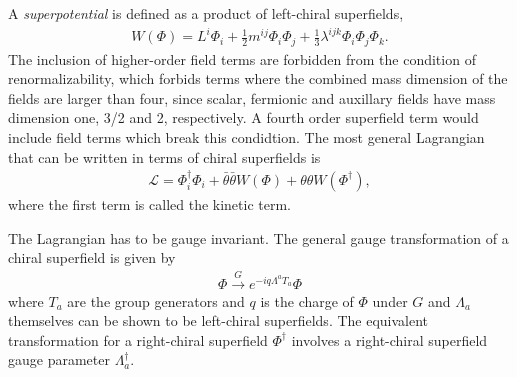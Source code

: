 \documentclass[twoside,english]{uiofysmaster}
\begin{document}
 A {\it superpotential} is defined as a product of left-chiral superfields,
 \begin{align}
 	W(\Phi) = L^i\Phi_i + \frac{1}{2}m^{ij}\Phi_i\Phi_j + \frac{1}{3}\lambda^{ijk}\Phi_i\Phi_j\Phi_k.
 \end{align}
The inclusion of higher-order field terms are forbidden from the condition of renormalizability, which forbids terms where the combined mass dimension of the fields are larger than four, since scalar, fermionic and auxillary fields have mass dimension one, 3/2 and 2, respectively. A fourth order superfield term would include field terms which break this condidtion. The most general Lagrangian that can be written in terms of chiral superfields is
\begin{align}
	\mathcal{L} = \Phi_i^\dag \Phi_i + \bar\theta\bar\theta W(\Phi) + \theta\theta W(\Phi^\dag),
\end{align}
where the first term is called the kinetic term. 

The Lagrangian has to be gauge invariant. The general gauge transformation of a chiral superfield is given by
\begin{align}
	\Phi \overset{G}{\to} e^{-iq\Lambda^a T_a}\Phi
\end{align}
where $T_a$ are the group generators and $q$ is the charge of $\Phi$ under $G$ and $\Lambda_a$ themselves can be shown to be left-chiral superfields. The equivalent transformation for a right-chiral superfield $\Phi^\dag$ involves a right-chiral superfield gauge parameter $\Lambda_a^\dag$.
\end{document}
